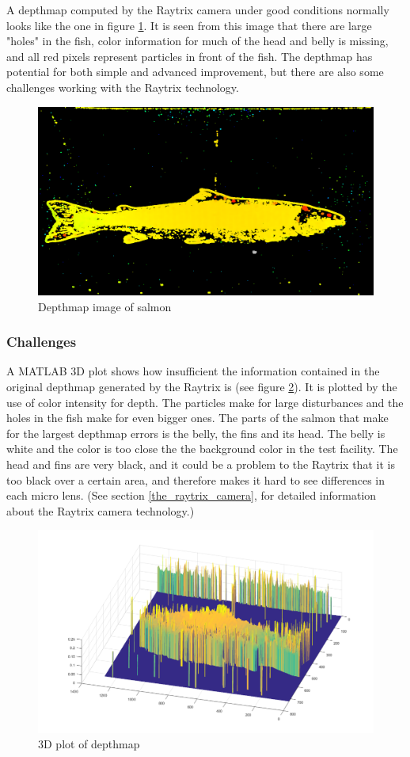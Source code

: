 A depthmap computed by the Raytrix camera under good conditions normally looks like the one in figure \ref{fig:depthmap82}. It is seen from this image that there are large "holes" in the fish, color information for much of the head and belly is missing, and all red pixels represent particles in front of the fish. The depthmap has potential for both simple and advanced improvement, but there are also some challenges working with the Raytrix technology.

\begin{figure}[H]
    \centering
    \includegraphics[width=.7\linewidth]{images/aim_of_study/depthmap82}
    \caption{Depthmap image of salmon}
    \label{fig:depthmap82}
\end{figure}



\subsubsection{Challenges}

A MATLAB 3D plot shows how insufficient the information contained in the original depthmap generated by the Raytrix is (see figure \ref{fig:matlab3D}). It is plotted by the use of color intensity for depth. The particles make for large disturbances and the holes in the fish make for even bigger ones. The parts of the salmon that make for the largest depthmap errors is the belly, the fins and its head. The belly is white and the color is too close the the background color in the test facility. The head and fins are very black, and it could be a problem to the Raytrix that it is too black over a certain area, and therefore makes it hard to see differences in each micro lens. (See section \ref{the_raytrix_camera}, for detailed information about the Raytrix camera technology.)

\begin{figure}[H]
    \centering
    \includegraphics[width=.7\linewidth]{images/aim_of_study/original_3D_87}
    \caption{3D plot of depthmap}
    \label{fig:matlab3D}
\end{figure}

